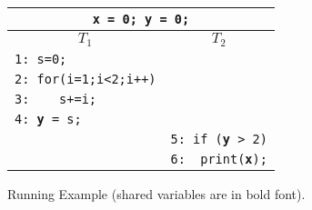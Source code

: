 


%



\begin{figure}
\centering
\begin{tabular}{ll}
\multicolumn{2}{c}{{\tt {\bf x} = 0; {\bf y} = 0;}} \\
\hline
\multicolumn{1}{c}{$T_1$} & \multicolumn{1}{c}{$T_2$} \\
\hline
{\tt 1: s=0; } & \\
{\tt 2: for(i=1;i<2;i++)} & \\
{\tt 3: \ \ \ s+=i;} & \\
{\tt 4: {\bf y} = s;} & \\
& {\tt 5: if ({\bf y} > 2)} \\
& {\tt 6:~~print({\bf x});} \\	
\end{tabular}
\caption{Running Example (shared variables are in bold font). }
\label{fig:running2}
\end{figure}


